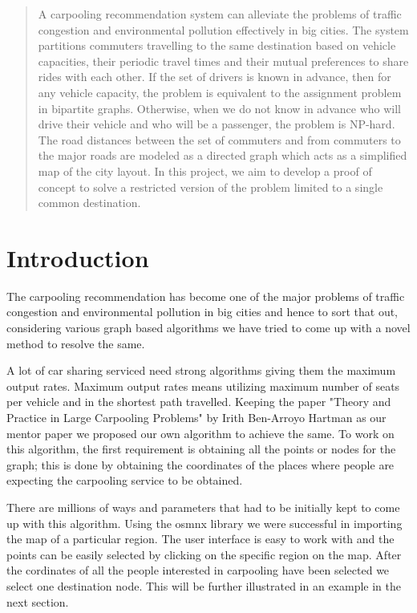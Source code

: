 \documentclass[main.tex]{subfiles}
\begin{document}
  \begin{abstract}
    A carpooling recommendation system can alleviate the problems of traffic
    congestion and environmental pollution effectively in big cities. The system
    partitions commuters travelling to the same destination based on vehicle
    capacities, their periodic travel times and their mutual preferences to
    share rides with each other. If the set of drivers is known in advance, then
    for any vehicle capacity, the problem is equivalent to the assignment
    problem in bipartite graphs. Otherwise, when we do not know in advance who
    will drive their vehicle and who will be a passenger, the problem is
    NP-hard. The road distances between the set of commuters and from commuters
    to the major roads are modeled as a directed graph which acts as a
    simplified map of the city layout. In this project, we aim to develop a
    proof of concept to solve a restricted version of the problem limited to a
    single common destination.
  \end{abstract}

\section{Introduction}
The carpooling recommendation has become one of the major problems of traffic
congestion and environmental pollution in big cities and hence to sort that out,
considering various graph based algorithms we have tried to come up with a novel
method to resolve the same.

A lot of car sharing serviced need strong algorithms giving them the maximum
output rates. Maximum output rates means utilizing maximum number of seats per
vehicle and in the shortest path travelled. Keeping the paper "Theory and
Practice in Large Carpooling Problems" by Irith Ben-Arroyo Hartman as our mentor
paper we proposed our own algorithm to achieve the same.  To work on this
algorithm, the first requirement is obtaining all the points or nodes for the
graph; this is done by obtaining the coordinates of the places where people are
expecting the carpooling service to be obtained.

There are millions of ways and parameters that had to be initially kept to come
up with this algorithm. Using the osmnx library we were successful in importing
the map of a particular region. The user interface is easy to work with and the
points can be easily selected by clicking on the specific region on the map.
After the cordinates of all the people interested in carpooling have been
selected we select one destination node. This will be further illustrated in an
example in the next section.
\end{document}
